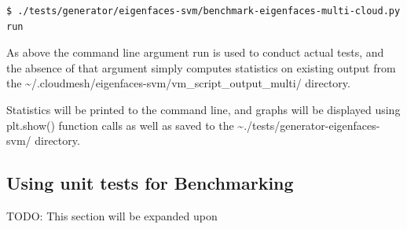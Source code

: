 \begin{verbatim}
$ ./tests/generator/eigenfaces-svm/benchmark-eigenfaces-multi-cloud.py run
\end{verbatim}

As above the command line argument run is used to conduct actual tests,
and the absence of that argument simply computes statistics on existing
output from the
\textasciitilde/.cloudmesh/eigenfaces-svm/vm\_script\_output\_multi/
directory.

Statistics will be printed to the command line, and graphs will be
displayed using plt.show() function calls as well as saved to the
\textasciitilde./tests/generator-eigenfaces-svm/ directory.

\subsection{Using unit tests for
Benchmarking}\label{a.4.-using-unit-tests-for-benchmarking}

TODO: This section will be expanded upon

